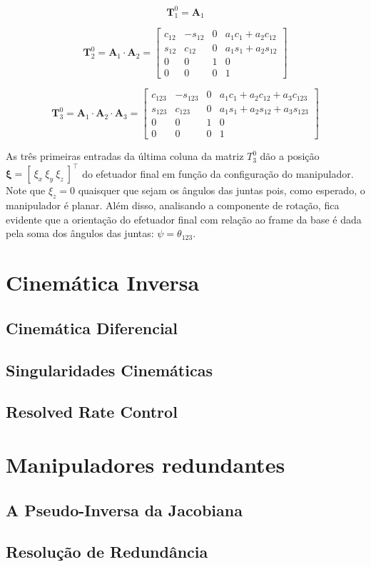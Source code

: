\begin{equation}
    \bm{T}^0_1 = \bm{A}_1
\end{equation}

\begin{equation}
    \bm{T}^0_2 = \bm{A}_1 \cdot \bm{A}_2 = \begin{bmatrix}
        c_{12} & -s_{12} & 0 & a_1c_1 + a_2c_{12} \\
        s_{12} & c_{12} & 0 & a_1s_1 + a_2s_{12} \\
        0 & 0 & 1 & 0 \\
        0 & 0 & 0 & 1
    \end{bmatrix}
\end{equation}

\begin{equation}
    \bm{T}^0_3 = \bm{A}_1 \cdot \bm{A}_2 \cdot \bm{A}_3 = \begin{bmatrix}
        c_{123} & -s_{123} & 0 & a_1c_1 + a_2c_{12} + a_3c_{123} \\
        s_{123} & c_{123} & 0 & a_1s_1 + a_2s_{12} + a_3s_{123} \\
        0 & 0 & 1 & 0 \\
        0 & 0 & 0 & 1
    \end{bmatrix}
\end{equation}

As três primeiras entradas da última coluna da matriz \(T^0_3\) dão a posição \(\bm{\xi} = [ \ \xi_x \ \xi_y \ \xi_z \ ]^\top \) do efetuador final em função da configuração do manipulador. Note que $\xi_z = 0$ quaisquer que sejam os ângulos das juntas pois, como esperado, o manipulador é planar. Além disso, analisando a componente de rotação, fica evidente que a orientação do efetuador final com relação ao frame da base é dada pela soma dos ângulos das juntas: $\psi = \theta_{123}$.

\section{Cinemática Inversa}


\subsection{Cinemática Diferencial}

\subsection{Singularidades Cinemáticas}

\subsection{Resolved Rate Control}

\section{Manipuladores redundantes}

\subsection{A Pseudo-Inversa da Jacobiana}

\subsection{Resolução de Redundância}

